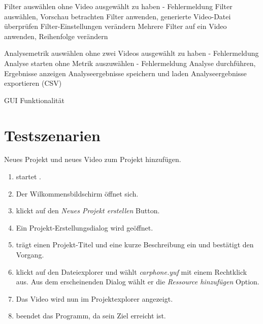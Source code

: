  Filter auswählen ohne Video ausgewählt zu haben - Fehlermeldung
 Filter auswählen, Vorschau betrachten
 Filter anwenden, generierte Video-Datei überprüfen
 Filter-Einstellungen verändern
 Mehrere Filter auf ein Video anwenden, Reihenfolge verändern

 Analysemetrik auswählen ohne zwei Videos ausgewählt zu haben - Fehlermeldung
 Analyse starten ohne Metrik auszuwählen - Fehlermeldung
 Analyse durchführen, Ergebnisse anzeigen
 Analyseergebnisse speichern und laden
 Analyseergebnisse exportieren (CSV)

 GUI Funktionalität




\section{Testszenarien}
\setcounter{counterKriterien}{0}


 Neues Projekt und neues Video zum Projekt hinzufügen.\\
\begin{enumerate}
\item \dAU startet \projektTitel.
\item Der Wilkommensbildschirm öffnet sich.
\item \dAU klickt auf den \emph{Neues Projekt erstellen} Button.
\item Ein Projekt-Erstellungsdialog wird geöffnet.
\item \dAU trägt einen Projekt-Titel und eine kurze Beschreibung ein und bestätigt den Vorgang.
\item \dAU klickt auf den Dateiexplorer und wählt \emph{carphone.yuf} mit einem Rechtklick aus. Aus dem erscheinenden Dialog wählt er die \emph{Ressource hinzufügen} Option.
\item Das Video wird nun im Projektexplorer angezeigt.
\item \dAU beendet das Programm, da sein Ziel erreicht ist.
\end{enumerate}


